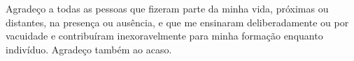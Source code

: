 Agradeço a todas as pessoas que fizeram parte da minha vida, próximas ou distantes, na presença ou ausência, e que me ensinaram deliberadamente ou por vacuidade e contribuíram inexoravelmente para minha formação enquanto indivíduo. Agradeço também ao acaso.
